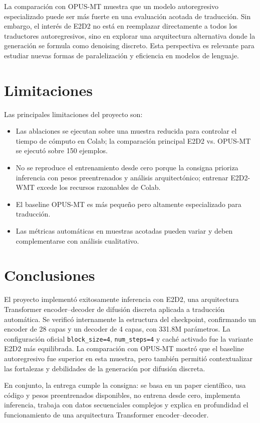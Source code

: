 \documentclass[conference]{IEEEtran}
\begin{document}
La comparación con OPUS-MT muestra que un modelo autoregresivo especializado puede ser más fuerte en una evaluación acotada de traducción. Sin embargo, el interés de E2D2 no está en reemplazar directamente a todos los traductores autoregresivos, sino en explorar una arquitectura alternativa donde la generación se formula como denoising discreto. Esta perspectiva es relevante para estudiar nuevas formas de paralelización y eficiencia en modelos de lenguaje.

\section{Limitaciones}

Las principales limitaciones del proyecto son:

\begin{itemize}
    \item Las ablaciones se ejecutan sobre una muestra reducida para controlar el tiempo de cómputo en Colab; la comparación principal E2D2 vs. OPUS-MT se ejecutó sobre 150 ejemplos.
    \item No se reproduce el entrenamiento desde cero porque la consigna prioriza inferencia con pesos preentrenados y análisis arquitectónico; entrenar E2D2-WMT excede los recursos razonables de Colab.
    \item El baseline OPUS-MT es más pequeño pero altamente especializado para traducción.
    \item Las métricas automáticas en muestras acotadas pueden variar y deben complementarse con análisis cualitativo.
\end{itemize}

\section{Conclusiones}

El proyecto implementó exitosamente inferencia con E2D2, una arquitectura Transformer encoder--decoder de difusión discreta aplicada a traducción automática. Se verificó internamente la estructura del checkpoint, confirmando un encoder de 28 capas y un decoder de 4 capas, con 331.8M parámetros. La configuración oficial \texttt{block\_size=4}, \texttt{num\_steps=4} y caché activado fue la variante E2D2 más equilibrada. La comparación con OPUS-MT mostró que el baseline autoregresivo fue superior en esta muestra, pero también permitió contextualizar las fortalezas y debilidades de la generación por difusión discreta.

En conjunto, la entrega cumple la consigna: se basa en un paper científico, usa código y pesos preentrenados disponibles, no entrena desde cero, implementa inferencia, trabaja con datos secuenciales complejos y explica en profundidad el funcionamiento de una arquitectura Transformer encoder--decoder.



\end{document}
